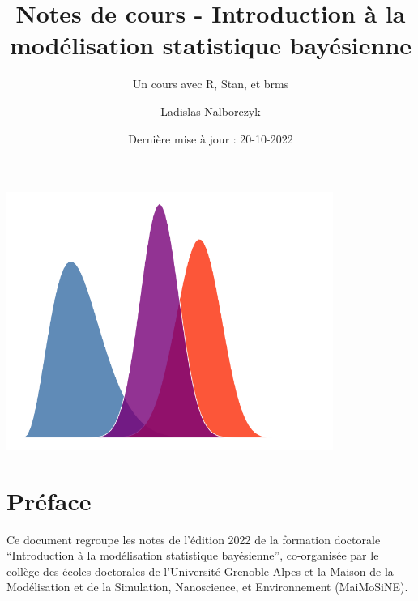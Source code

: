 \documentclass[
  a4paper,11pt,twoside,onecolumn,openright,final,oldfontcommands]{memoir}
\title{Notes de cours - Introduction à la modélisation statistique bayésienne}
\subtitle{Un cours avec R, Stan, et brms}
\author{Ladislas Nalborczyk}
\date{Dernière mise à jour : 20-10-2022}
\newcommand\blankpage{%
    \null
    \thispagestyle{empty}%
    \newpage
    }
\theoremstyle{definition}
\theoremstyle{definition}
\theoremstyle{definition}
\theoremstyle{definition}
\theoremstyle{remark}
\begin{document}
\maketitle


\thispagestyle{empty}


\begin{center} %

  \includegraphics[width=0.8\textwidth]{figures/cover_distributions.png}

\end{center}

\newpage
\blankpage %

\OnehalfSpacing %


{
\hypersetup{linkcolor=}
\setcounter{tocdepth}{2}
\tableofcontents
}
\hypertarget{pruxe9face}{%
\chapter*{Préface}\label{pruxe9face}}


Ce document regroupe les notes de l'édition 2022 de la formation doctorale ``Introduction à la modélisation statistique bayésienne'', co-organisée par le collège des écoles doctorales de l'Université Grenoble Alpes et la Maison de la Modélisation et de la Simulation, Nanoscience, et Environnement (MaiMoSiNE).
\end{document}
